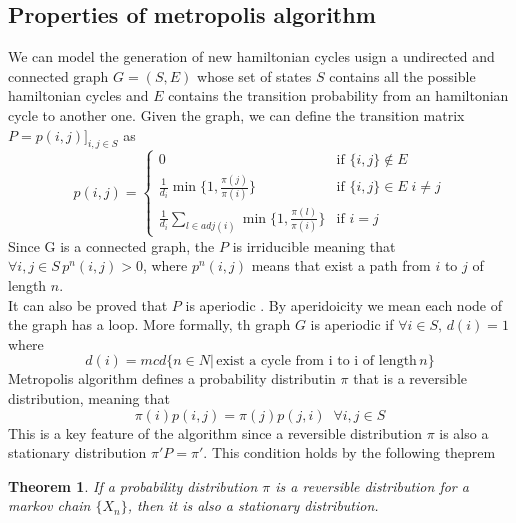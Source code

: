 \documentclass{article}
\newtheorem{theorem}{Theorem}
\begin{document}
\subsection{Properties of metropolis algorithm}
We can model the generation of new hamiltonian cycles usign a undirected and connected graph $G = (S,E)$ whose set of states $S$ contains all the possible hamiltonian cycles and $E$ contains the transition probability from an hamiltonian cycle to another one. Given the graph, we can define the transition matrix $P=p(i,j)]_{i,j\in S}$ as
\begin{equation}
p(i,j) =  \begin{cases} 
	0\, & \mbox{if } \{i,j\} \notin E  \\ 
	\frac{1}{d_i} \min\{1,\frac{\pi(j)}{\pi(i)}\} & \mbox{if }  \{i,j\} \in E \; i \neq j\\
	\frac{1}{d_i} \sum_{l \in adj(i)} \min\{1,\frac{\pi(l)}{\pi(i)}\}  & \mbox{if }  i = j 
\end{cases}
\end{equation}
Since G is a connected graph, the $P$ is irriducible meaning that $\forall i,j \in S \, p^n(i,j) > 0$, where $p^n(i,j)$ means that exist a path from $i$ to $j$ of length $n$.\\
It can also be proved that $P$ is aperiodic \cite{metropolis}. By aperidoicity we mean each node of the graph has a loop. More formally, th graph $G$ is aperiodic if $\forall i \in S, \,d(i)  = 1$ where
\begin{equation}
d(i) = mcd \{n \in N | \, \text{exist a cycle from i to i of length} \, n\}
\end{equation}
Metropolis algorithm defines a probability distributin $\pi$ that is a reversible distribution, meaning that
\begin{equation}
	\pi(i)p(i,j) = \pi(j)p(j,i) \;\; \forall i,j \in S
\end{equation}
This is a key feature of the algorithm since a reversible distribution $\pi$ is also a stationary distribution $\pi'P=\pi'$. This condition holds by the following theprem
\begin{theorem}
If a probability distribution $\pi$ is a reversible distribution for a markov chain $ \{X_n\} $, then it is also a stationary distribution.
\end{theorem}
\end{document}
